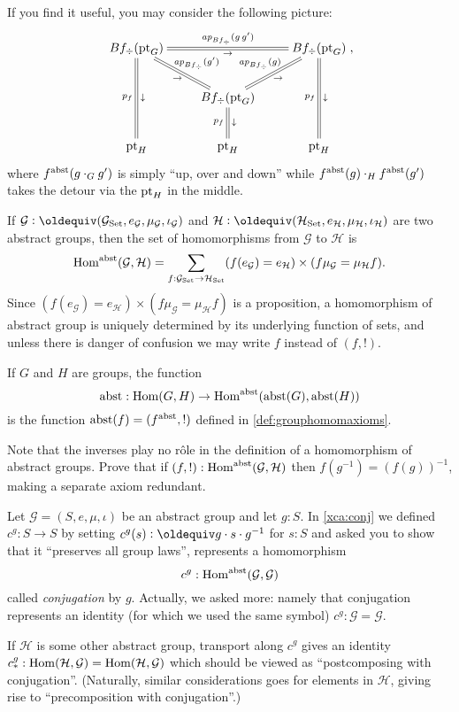 \begin{definition}
\begin{enumerate}
If you find it useful, you may consider the following picture:
$$\xymatrix{
Bf_\div(\pt_G)\ar@{=}[rr]^{\ap{Bf_\div}(g\, g')}_\to\ar@{=}[dr]^{\ap{Bf_\div}(g')}_\to\ar@{=}[dd]_{p_f}^\downarrow
&&Bf_\div(\pt_G)\ar@{=}[dd]_{p_f}^\downarrow\\
&Bf_\div(\pt_G)\ar@{=}[d]_{p_f}^\downarrow
\ar@{=}[ur]^{\ap{Bf_\div}(g)}_\to
&\\
\pt_H&\pt_H&\pt_H},$$
where $f^{\mathrm{abst}}(g\cdot_Gg')$ is simply ``up, over and down'' while $f^{\mathrm{abst}}(g)\cdot_Hf^{\mathrm{abst}}(g')$ takes the detour via the ${\mathord{\mathrm{pt}}}_H$ in the middle.
  \end{enumerate}
\end{definition}
\begin{definition}\label{def:abstrisfunctor}
  If $\mathcal G\defequi(\mathcal G_{\Set},e_{\mathcal G},\mu_{\mathcal G},\iota_{\mathcal G})$ and $\mathcal H\defequi(\mathcal H_{\Set},e_{\mathcal H},\mu_{\mathcal H},\iota_{\mathcal H})$ are two abstract groups, then the set of homomorphisms from $\mathcal G$ to $\mathcal H$ is
 $$  \Hom^\abstr(\mathcal G,\mathcal H)%
=\sum_{f:\mathcal G_{\Set}\to \mathcal H_{\Set}}(f(e_{\mathcal G})=e_{\mathcal H})\times (f\mu_{\mathcal G}=\mu_{\mathcal H}f).
$$
Since $(f(e_{\mathcal G})=e_{\mathcal H})\times (f\mu_{\mathcal G}=\mu_{\mathcal H}f)$ is a proposition, a homomorphism of abstract group is uniquely determined by its underlying function of sets, and unless there is danger of confusion we may write $f$ instead of $(f,!)$. 

If $G$ and $H$ are groups, the function
$$\mathrm{abst}:\mathrm{Hom}(G,H)\to\mathrm{Hom}^{\mathrm{abst}}(\mathrm{abst}(G),\mathrm{abst}(H))$$
is the function $\mathrm{abst}(f)=(f^{\mathrm{abst}},!)$ defined in \cref{def:grouphomomaxioms}.
\end{definition}
\begin{xca}
  Note that the inverses play no r\^ole in the definition of a homomorphism of abstract groups.  Prove that if $(f,!):\mathrm{Hom}^{\mathrm{abst}}(\mathcal G,\mathcal H)$
then $f(g^{-1})=(f(g))^{-1}$, making a separate axiom redundant.  
\end{xca}
\begin{example}
  \label{ex:conjhomo}
  Let $\mathcal G=(S,e,\mu,\iota)$ be an abstract group and let $g:S$.  In \cref{xca:conj} we defined $c^g:S\to S$ by setting $c^g(s)\defequi g\cdot s\cdot g^{-1}$ for $s:S$ and asked you to show that it ``preserves all group laws'', \ie represents a homomorphism
$$c^g:\mathrm{Hom}^{\mathrm{abst}}(\mathcal G,\mathcal G)$$
called \emph{conjugation} by $g$.  
Actually, we asked more: namely that conjugation represents an identity (for which we used the same symbol) $c^g:\mathcal G=\mathcal G$.

If $\mathcal H$ is some other abstract group, transport along $c^g$ gives an identity
 $c^g_*:\mathrm{Hom}(\mathcal H,\mathcal G)=\mathrm{Hom}(\mathcal H,\mathcal G)$ which should be viewed as ``postcomposing with conjugation''.  (Naturally, similar considerations goes for elements in $\mathcal H$, giving rise to ``precomposition with conjugation''.)
\end{example}

